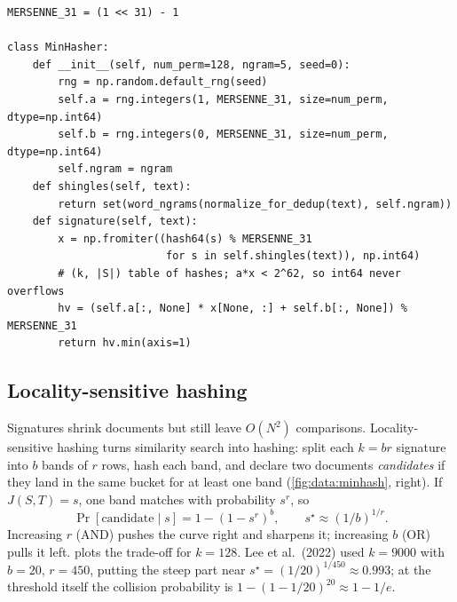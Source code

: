 \begin{lstlisting}[caption={Vectorised MinHash signatures (from \code{llmsys/datapipe/dedup.py}).},label={lst:data:minhash}]
MERSENNE_31 = (1 << 31) - 1

class MinHasher:
    def __init__(self, num_perm=128, ngram=5, seed=0):
        rng = np.random.default_rng(seed)
        self.a = rng.integers(1, MERSENNE_31, size=num_perm, dtype=np.int64)
        self.b = rng.integers(0, MERSENNE_31, size=num_perm, dtype=np.int64)
        self.ngram = ngram
    def shingles(self, text):
        return set(word_ngrams(normalize_for_dedup(text), self.ngram))
    def signature(self, text):
        x = np.fromiter((hash64(s) % MERSENNE_31
                         for s in self.shingles(text)), np.int64)
        # (k, |S|) table of hashes; a*x < 2^62, so int64 never overflows
        hv = (self.a[:, None] * x[None, :] + self.b[:, None]) % MERSENNE_31
        return hv.min(axis=1)
\end{lstlisting}

\subsection{Locality-sensitive hashing}\label{sec:data:lsh}

Signatures shrink documents but still leave $O(N^2)$ comparisons. Locality-sensitive hashing
turns similarity search into hashing: split each $k=br$ signature into $b$ bands of $r$ rows, hash
each band, and declare two documents \emph{candidates} if they land in the same bucket for at least
one band (\cref{fig:data:minhash}, right). If $J(S,T)=s$, one band matches with probability $s^r$,
so
\begin{equation}
\Pr[\text{candidate}\mid s] = 1-\left(1-s^{r}\right)^{b},
\qquad s^\star \approx \left(1/b\right)^{1/r}.
\label{eq:data:scurve}
\end{equation}
Increasing $r$ (AND) pushes the curve right and sharpens it; increasing $b$ (OR) pulls it left.
 plots the trade-off for $k=128$. Lee et al.\ (2022) used $k=9000$ with
$b=20$, $r=450$, putting the steep part near $s^\star=(1/20)^{1/450}\approx0.993$; at the
threshold itself the collision probability is $1-(1-1/20)^{20}\approx 1-1/e$.

